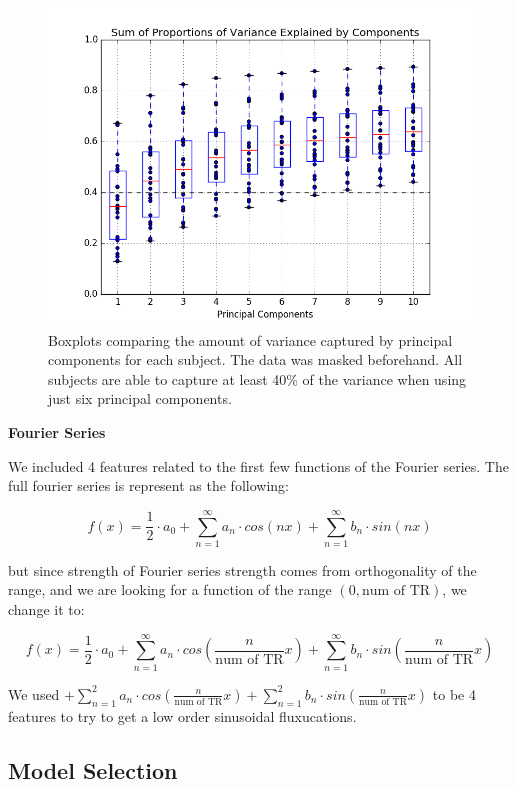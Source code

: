 \begin{figure}[ht]
	\centering
	\includegraphics[width=.5\linewidth]{../images/pcaBOX.png}
 	\caption{Boxplots comparing the amount of variance captured by principal 
components for each subject. The data was masked beforehand. All subjects are 
able to capture at least 40\% of the variance when using just six principal 
components.}
 	\label{fig:pcabox}
\end{figure}


\vspace{2mm}
\noindent \textbf{Fourier Series}
\vspace{2mm}
\par We included 4 features related to the first few functions of the Fourier series.
The full fourier series is represent as the following:

\begin{equation}
f(x) = \frac{1}{2} \cdot a_0 + \sum_{n=1}^{\infty} a_n \cdot cos(n x) + \sum_{n=1}^{\infty} b_n \cdot  sin(n x)
\end{equation}

\noindent but since strength of Fourier series strength comes from 
orthogonality of the range, and we are looking for a function of the range 
$(0, \text{num of TR})$, we change it to:

\begin{equation}
f(x) = \frac{1}{2} \cdot a_0 + \sum_{n=1}^{\infty} a_n \cdot cos(\frac{n}{\text{num of TR}} x) + \sum_{n=1}^{\infty} b_n \cdot sin(\frac{n}{\text{num of TR}} x)
\end{equation}

\noindent We used $ + \sum_{n=1}^{2} a_n \cdot cos(\frac{n}{\text{num of TR}} x) + 
\sum_{n=1}^{2} b_n \cdot sin(\frac{n}{\text{num of TR}} x)$ to be 4 features to try 
to get a low order sinusoidal fluxucations.

\subsection{Model Selection}

